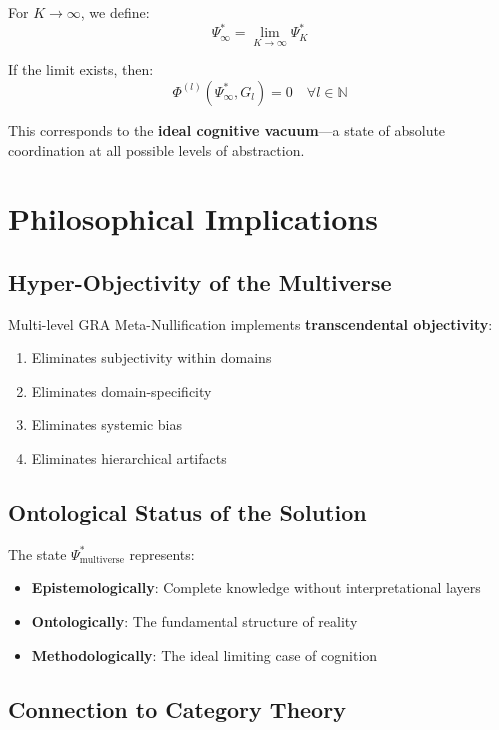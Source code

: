 \documentclass[12pt,a4paper]{article}
\newcommand{\PhiFunc}{\Phi}
\newcommand{\bbN}{\mathbb{N}}
\begin{document}
For $K \to \infty$, we define:
\begin{equation}
\Psi_{\infty}^* = \lim_{K \to \infty} \Psi_K^*
\end{equation}

If the limit exists, then:
\begin{equation}
\PhiFunc^{(l)}(\Psi_{\infty}^*, G_l) = 0 \quad \forall l \in \bbN
\end{equation}

This corresponds to the \textbf{ideal cognitive vacuum}---a state of absolute coordination at all possible levels of abstraction.

\section{Philosophical Implications}

\subsection{Hyper-Objectivity of the Multiverse}

Multi-level GRA Meta-Nullification implements \textbf{transcendental objectivity}:
\begin{enumerate}
    \item Eliminates subjectivity within domains
    \item Eliminates domain-specificity
    \item Eliminates systemic bias
    \item Eliminates hierarchical artifacts
\end{enumerate}

\subsection{Ontological Status of the Solution}

The state $\Psi_{\text{multiverse}}^*$ represents:
\begin{itemize}
    \item \textbf{Epistemologically}: Complete knowledge without interpretational layers
    \item \textbf{Ontologically}: The fundamental structure of reality
    \item \textbf{Methodologically}: The ideal limiting case of cognition
\end{itemize}

\subsection{Connection to Category Theory}
\end{document}
